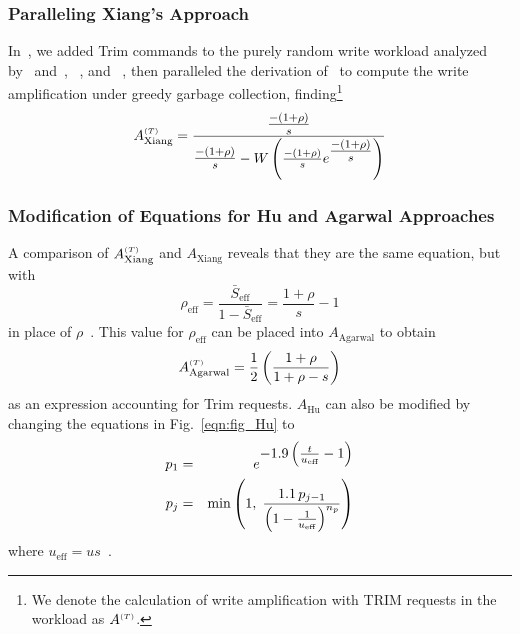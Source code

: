 \documentclass[prodmode,acmtos]{acmsmall}
\begin{document}
\subsubsection{Paralleling Xiang's Approach}
In~\cite{frankie2012_ciit}, we added Trim commands to the purely random write workload analyzed by~ and~, ~, and ~, then paralleled the derivation of~ to compute the write amplification under greedy garbage collection, finding\footnote{We denote the calculation of write amplification with TRIM requests in the workload as $A^{\text{\tiny ($T$)}}$.}
\begin{equation}\label{eqn:Xiang_derived}
A_\text{Xiang}^{\text{\tiny ($T$)}} = \frac{\text{\large${\frac{-(1+\rho)}{s}}$}} {\text{\large${\frac{-(1+\rho)}{s}}$} - W\left(\frac{-(1+\rho)}{s} e^\text{\large${\frac{-(1+\rho)}{s}}$}\right)}
\end{equation}

\subsubsection{Modification of Equations for Hu and Agarwal Approaches}
A comparison of $A_\text{Xiang}^{\text{\tiny ($T$)}}$ and $A_\text{Xiang}$ reveals that they are the same equation, but with
\begin{equation}\label{eqn:eff_rho}
\rho_\text{eff} = \frac{\bar{S}_\text{eff}}{1-\bar{S}_\text{eff}} = \frac{1+\rho}{s}-1
\end{equation}
in place of $\rho$~\cite{frankie2012_ciit}.  This value for $\rho_\text{eff}$ can be placed into $A_\text{Agarwal}$ to obtain
\begin{equation*}
A_\text{Agarwal}^{\text{\tiny ($T$)}} = \frac{1}{2} \left( \frac{1+\rho}{1+\rho-s} \right)
\end{equation*}
as an expression accounting for Trim requests.  $A_\text{Hu}$ can also be modified by changing the equations in Fig.~\ref{eqn:fig_Hu} to
\begin{eqnarray*}
p_1 &=& e^{\text{\normalsize$-1.9\left(\frac{t}{u_\text{eff}}-1\right)$}} \\
p_j &=& \text{min}\left(1, \; \frac{1.1 \, p_{j-1}}{ \left(1-\frac{1}{u_\text{eff}}\right)^{n_p}} \right)
\end{eqnarray*}
where $u_\text{eff}=us$~\cite{frankie2012_ciit}.
\end{document}

